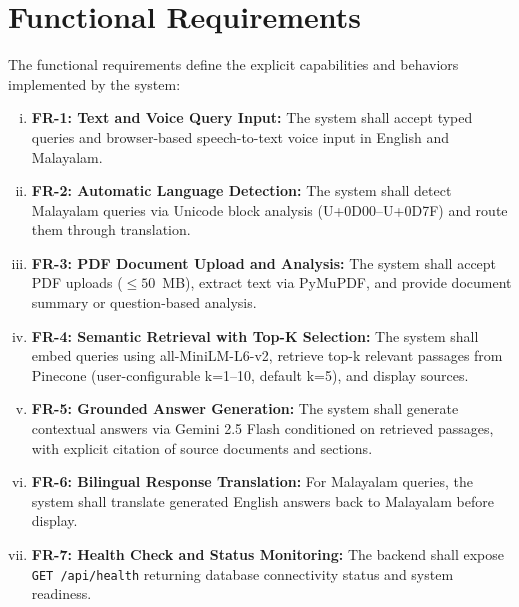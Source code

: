 \documentclass[12pt,a4paper]{report}
\begin{document}
\section{Functional Requirements}
The functional requirements define the explicit capabilities and behaviors implemented by the system:
\begin{enumerate}[(i)]
    \item \textbf{FR-1: Text and Voice Query Input:} The system shall accept typed queries and browser-based speech-to-text voice input in English and Malayalam.
    \item \textbf{FR-2: Automatic Language Detection:} The system shall detect Malayalam queries via Unicode block analysis (U+0D00–U+0D7F) and route them through translation.
    \item \textbf{FR-3: PDF Document Upload and Analysis:} The system shall accept PDF uploads ($\le 50$~MB), extract text via PyMuPDF, and provide document summary or question-based analysis.
    \item \textbf{FR-4: Semantic Retrieval with Top-K Selection:} The system shall embed queries using all-MiniLM-L6-v2, retrieve top-k relevant passages from Pinecone (user-configurable k=1–10, default k=5), and display sources.
    \item \textbf{FR-5: Grounded Answer Generation:} The system shall generate contextual answers via Gemini 2.5 Flash conditioned on retrieved passages, with explicit citation of source documents and sections.
    \item \textbf{FR-6: Bilingual Response Translation:} For Malayalam queries, the system shall translate generated English answers back to Malayalam before display.
    \item \textbf{FR-7: Health Check and Status Monitoring:} The backend shall expose \texttt{GET /api/health} returning database connectivity status and system readiness.
\end{enumerate}
\end{document}
